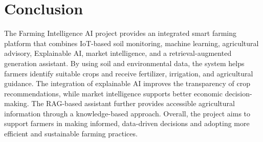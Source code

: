 \chapter{Conclusion}

The Farming Intelligence AI project provides an integrated smart farming platform that combines IoT-based soil monitoring, machine learning, agricultural advisory, Explainable AI, market intelligence, and a retrieval-augmented generation assistant. By using soil and environmental data, the system helps farmers identify suitable crops and receive fertilizer, irrigation, and agricultural guidance. The integration of explainable AI improves the transparency of crop recommendations, while market intelligence supports better economic decision-making. The RAG-based assistant further provides accessible agricultural information through a knowledge-based approach. Overall, the project aims to support farmers in making informed, data-driven decisions and adopting more efficient and sustainable farming practices.